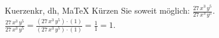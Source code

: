 \begin{MAufgabe}{Kuerzen}{kr, dh, MaTeX}
K\"urzen Sie soweit m\"oglich: $\frac{27\, x^3\, y^5}{27\, x^3\, y^5}$.\\ 
\ifLsg\MLoesung
\quad $\frac{27\, x^3\, y^5}{27\, x^3\, y^5}=\frac{(27\, x^3\, y^5)\cdot(1)}{(27\, x^3\, y^5)\cdot(1)}=\frac{1}{1}=1$.\else\relax\fi
 \end{MAufgabe}